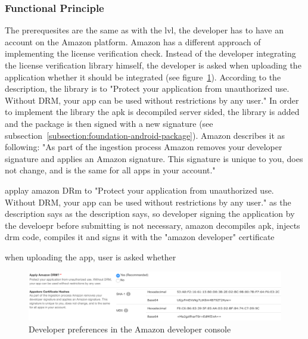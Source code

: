 \subsubsection{Functional Principle}\label{section:license-amazon-functional}
The prerequesites are the same as with the \gls{lvl}, the developer has to have an account on the Amazon platform.
Amazon has a different approach of implementing the license verification check.
Instead of the developer integrating the license verification library himself, the developer is asked when uploading the application whether it should be integrated (see figure~\ref{fig:amazon}).
According to the description, the library is to "Protect your application from unauthorized use. Without DRM, your app can be used without restrictions by any user." \cite{amazonDeveloper}
In order to implement the library the \gls{apk} is decompiled server sided, the library is added and the package is then signed with a new signature (see subsection~\ref{subsection:foundation-android-package}).
Amazon describes it as following: "As part of the ingestion process Amazon removes your developer signature and applies an Amazon signature. This signature is unique to you, does not change, and is the same for all apps in your account." \cite{amazonDeveloper}

 applay amazon DRm to "Protect your application from unauthorized use. Without DRM, your app can be used without restrictions by any user." as the description says
  as the description says, so developer signing the application by the develoepr before submitting is not necessary, amazon decompiles apk, injects drm code, compiles it and signs it with the "amazon developer" certificate

when uploading the app, user is asked whether
\begin{figure}[h]
    \centering
    \includegraphics[width=1\textwidth]{data/amazon.png}
    \caption{Developer preferences in the Amazon developer console \cite{amazonDeveloper}}
    \label{fig:amazon}
\end{figure}

